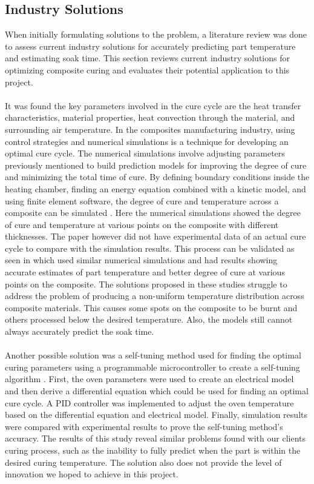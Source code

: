 \subsection{Industry Solutions}
When initially formulating solutions to the problem, a literature review was done to assess current industry solutions for accurately predicting part temperature and estimating soak time. This section reviews current industry solutions for optimizing composite curing and evaluates their potential application to this project. \\\\
It was found the key parameters involved in the cure cycle are the heat transfer characteristics, material properties, heat convection through the material, and surrounding air temperature. In the composites manufacturing industry, using control strategies and numerical simulations is a technique for developing an optimal cure cycle. The numerical simulations involve adjusting parameters previously mentioned to build prediction models for improving the degree of cure and minimizing the total time of cure. By defining boundary conditions inside the heating chamber, finding an energy equation combined with a kinetic model, and using finite element software, the degree of cure and temperature across a composite can be simulated \cite{curesim}.  Here the numerical simulations showed the degree of cure and temperature at various points on the composite with different thicknesses. The paper however did not have experimental data of an actual cure cycle to compare with the simulation results. This process can be validated as seen in \cite{polylam} which used similar numerical simulations and had results showing accurate estimates of part temperature and better degree of cure at various points on the composite. The solutions proposed in these studies struggle to address the problem of producing a non-uniform temperature distribution across composite materials. This causes some spots on the composite to be burnt and others processed below the desired temperature. Also, the models still cannot always accurately predict the soak time.\\\\
Another possible solution was a self-tuning method used for finding the optimal curing parameters using a programmable microcontroller to create a self-tuning algorithm \cite{selftune}. First, the oven parameters were used to create an electrical model and then derive a differential equation which could be used for finding an optimal cure cycle. A PID controller was implemented to adjust the oven temperature based on the differential equation and electrical model. Finally, simulation results were compared with experimental results to prove the self-tuning method’s accuracy. The results of this study reveal similar problems found with our clients curing process, such as the inability to fully predict when the part is within the desired curing temperature. The solution also does not provide the level of innovation we hoped to achieve in this project.

